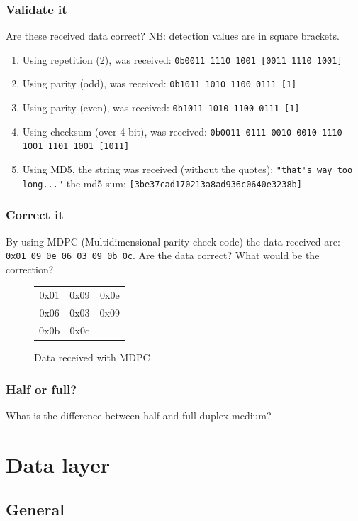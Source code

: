 \documentclass[11pt]{article}
\begin{document}
\subsubsection{Validate it}
Are these received data correct? NB: detection values are in square brackets.
  \begin{enumerate}
    \item Using repetition (2), was received: \verb$0b0011 1110 1001 [0011 1110 1001]$
    \item Using parity (odd), was received:  \verb$0b1011 1010 1100 0111 [1]$
    \item Using parity (even), was received: \verb$0b1011 1010 1100 0111 [1]$
    \item Using checksum (over 4 bit), was received: \verb$0b0011 0111 0010 0010 1110 1001 1101 1001 [1011]$
    \item Using MD5, the string was received (without the quotes): \verb$"that's way too long..."$ the md5 sum: \verb$[3be37cad170213a8ad936c0640e3238b]$
  \end{enumerate}


\subsubsection{Correct it}
By using MDPC (Multidimensional parity-check code) the data received are: \verb$0x01 09 0e 06 03 09 0b 0c$. Are the data correct? What would be the correction? \\
  \begin{figure}[h]
    \centering
    \begin{tabular}{cc|c}
      0x01 & 0x09 & 0x0e \\
      0x06 & 0x03 & 0x09 \\ \hline
      0x0b & 0x0c &
    \end{tabular}
    \caption{Data received with MDPC}
    \label{fig:ami}
  \end{figure}

\subsubsection{Half or full?}
What is the difference between half and full duplex medium?

\section{Data layer}
\subsection{General}
\end{document}
